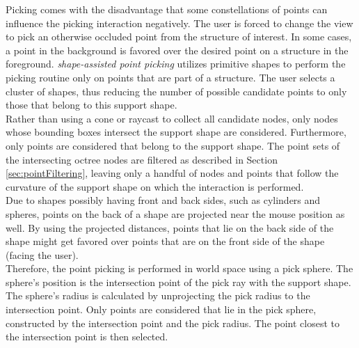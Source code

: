 Picking comes with the disadvantage that some constellations of points can influence the picking interaction negatively. The user is forced to change the view to pick an otherwise occluded point from the structure of interest. In some cases, a point in the background is favored over the desired point on a structure in the foreground. \textit{shape-assisted point picking} utilizes primitive shapes to perform the picking routine only on points that are part of a structure. The user selects a cluster of shapes, thus reducing the number of possible candidate points to only those that belong to this support shape. 
\\ 
Rather than using a cone or raycast to collect all candidate nodes, only nodes whose bounding boxes intersect the support shape are considered. Furthermore, only points are considered that belong to the support shape. The point sets of the intersecting octree nodes are filtered as described in Section \ref{sec:pointFiltering}, leaving only a handful of nodes and points that follow the curvature of the support shape on which the interaction is performed. 
\\
Due to shapes possibly having front and back sides, such as cylinders and spheres, points on the back of a shape are projected near the mouse position as well. By using the projected distances, points that lie on the back side of the shape might get favored over points that are on the front side of the shape (facing the user). 
\\
Therefore, the point picking is performed in world space using a pick sphere. The sphere's position is the intersection point of the pick ray with the support shape. The sphere's radius is calculated by unprojecting the pick radius to the intersection point. Only points are considered that lie in the pick sphere, constructed by the intersection point and the pick radius. The point closest to the intersection point is then selected. 
\\

